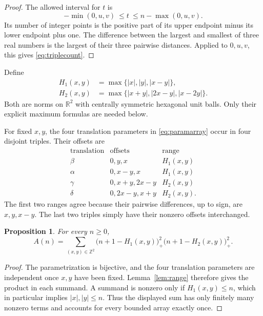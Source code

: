 \documentclass[11pt]{article}
\numberwithin{equation}{section}
\newtheorem{proposition}[theorem]{Proposition}
\theoremstyle{definition}
\newcommand{\Z}{\mathbb Z}
\newcommand{\R}{\mathbb R}
\begin{document}
\begin{proof}
The allowed interval for $t$ is
\[
 -\min(0,u,v)\ \leq t\ \leq n-\max(0,u,v).
\]
Its number of integer points is the positive part of its upper endpoint minus
its lower endpoint plus one. The difference between the largest and smallest
of three real numbers is the largest of their three pairwise distances.
Applied to $0,u,v$, this gives \eqref{eq:triplecount}.
\end{proof}

Define
\begin{align}
 H_1(x,y)&=\max\{|x|,|y|,|x-y|\},\label{eq:H1}\\
 H_2(x,y)&=\max\{|x+y|,|2x-y|,|x-2y|\}.\label{eq:H2}
\end{align}
Both are norms on $\R^2$ with centrally symmetric hexagonal unit balls.
Only their explicit maximum formulas are needed below.

For fixed $x,y$, the four translation parameters in
\eqref{eq:paramarray} occur in four disjoint triples. Their offsets are
\begin{equation}\label{eq:offsets}
\begin{array}{c|c|c}
\text{translation}&\text{offsets}&\text{range}\\ \hline
\beta&0,y,x&H_1(x,y)\\
\alpha&0,x-y,x&H_1(x,y)\\
\gamma&0,x+y,2x-y&H_2(x,y)\\
\delta&0,2x-y,x+y&H_2(x,y).
\end{array}
\end{equation}
The first two ranges agree because their pairwise differences, up to sign,
are $x,y,x-y$. The last two triples simply have their nonzero offsets
interchanged.

\begin{proposition}\label{prop:normcount}
For every $n\geq0$,
\begin{equation}\label{eq:normcount}
 A(n)=\sum_{(x,y)\in\Z^2}
 \bigl(n+1-H_1(x,y)\bigr)_+^2
 \bigl(n+1-H_2(x,y)\bigr)_+^2.
\end{equation}
\end{proposition}

\begin{proof}
The parametrization is bijective, and the four translation parameters are
independent once $x,y$ have been fixed. Lemma~\ref{lem:range} therefore gives
the product in each summand. A summand is nonzero only if $H_1(x,y)\leq n$,
which in particular implies $|x|,|y|\leq n$. Thus the displayed sum has only
finitely many nonzero terms and accounts for every bounded array exactly
once.
\end{proof}
\end{document}
